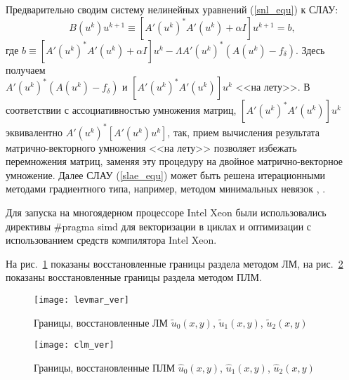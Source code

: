Предварительно сводим систему нелинейных уравнений (\ref{snl_equ}) к СЛАУ:
\begin{equation}\label{slae_equ}
B(u^k)u^{k+1}\equiv[A'(u^k)^*A'(u^k)+\alpha I]u^{k+1}=b,
\end{equation}
где $b\equiv[A'(u^k)^*A'(u^k)+\alpha I]u^k-\Lambda A'(u^k)^*(A(u^k)-f_\delta)$. Здесь получаем \\ $A'(u^k)^*(A(u^k)-f_\delta)$ и $[A'(u^k)^*A'(u^k)]u^k$ <<на лету>>. В соответствии с ассоциативностью умножения матриц, $[A'(u^k)^*A'(u^k)]u^k$ эквивалентно $A'(u^k)^*[A'(u^k)u^k]$, так, прием вычисления результата матрично-векторного умножения <<на лету>> позволяет избежать перемножения матриц, заменяя эту процедуру на двойное матрично-векторное умножение. Далее СЛАУ (\ref{slae_equ}) может быть решена итерационными методами градиентного типа, например, методом минимальных невязок  \cite{VasEre2009}, \cite{BachZhid1987}.

Для запуска на многоядерном процессоре Intel Xeon были использовались директивы \#pragma simd для векторизации в циклах и оптимизации с использованием средств компилятора Intel Xeon.

На рис.~\ref{fig:levmar} показаны восстановленные границы раздела методом ЛМ, на рис.~\ref{fig:clm} показаны восстановленные границы раздела методом ПЛМ.
\begin{figure}[H]
	\centering
	\texttt{[image: levmar\_ver]}
	\caption{Границы, восстановленные ЛМ $\tilde{u}_0(x,y)$, $\tilde{u}_1(x,y)$, $\tilde{u}_2(x,y)$}
	\label{fig:levmar}
\end{figure}
\begin{figure}[H]
	\centering
	\texttt{[image: clm\_ver]}
	\caption{Границы, восстановленные ПЛМ $\hat{u}_0(x,y)$, $\hat{u}_1(x,y)$, $\hat{u}_2(x,y)$}
	\label{fig:clm}
\end{figure}


